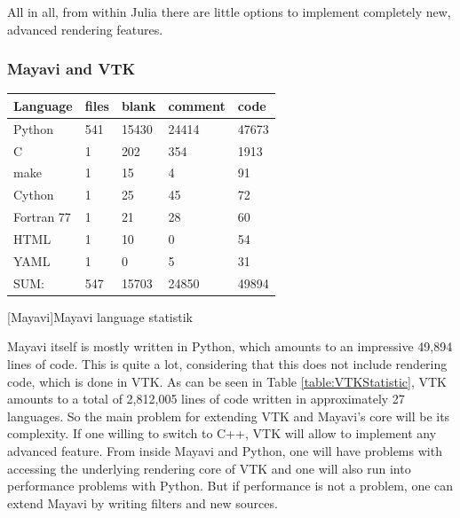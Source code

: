 {All in all, from within Julia there are little options to implement completely new, advanced rendering features.

\subsubsection{Mayavi and VTK}
\begin{table}[htbp]
    \centering
    \begin{tabular}{l|l|l|l|l}
        \hline
        \textbf{Language} &    \textbf{files} &    \textbf{blank} &  \textbf{comment} &  \textbf{code}\\
        \hline
        Python          &               541      &    15430     &    24414   &       47673\\
        C               &                 1      &     202      &      354   &      1913\\
        make            &                 1      &       15     &         4  &        91\\
        Cython          &                 1      &       25     &        45  &        72\\
        Fortran 77      &                 1      &       21     &        28  &        60\\
        HTML            &                 1      &       10     &         0  &        54\\
        YAML            &                 1      &        0     &        5   &       31\\
        \hline
        SUM:            &               547       &   15703     &     24850  &       49894\\
        \hline
        \end{tabular}
    [Mayavi]{Mayavi language statistik}
    \label{table:mayavistatistic}
\end{table}

Mayavi itself is mostly written in Python, which amounts to an impressive 49,894 lines of code. This is quite a lot, considering that this does not include rendering code, which is done in VTK.
As can be seen in Table \ref{table:VTKStatistic}, VTK amounts to a total of 2,812,005 lines of code written in approximately 27 languages. 
So the main problem for extending VTK and Mayavi's core will be its complexity. If one willing to switch to C++, VTK will allow to implement any advanced feature. From inside Mayavi and Python, one will have problems with accessing the underlying rendering core of VTK and one will also run into performance problems with Python.
But if performance is not a problem, one can extend Mayavi by writing filters and new sources\cite{MayaviExtension}.


}
